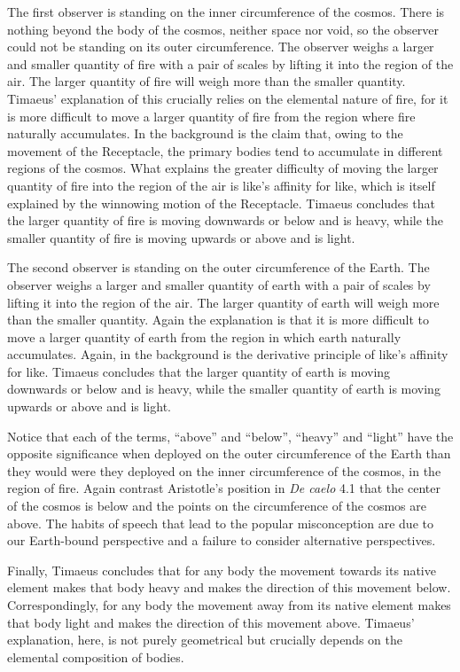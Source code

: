 The first observer is standing on the inner circumference of the cosmos. There is nothing beyond the body of the cosmos, neither space nor void, so the observer could not be standing on its outer circumference. The observer weighs a larger and smaller quantity of fire with a pair of scales by lifting it into the region of the air. The larger quantity of fire will weigh more than the smaller quantity. Timaeus' explanation of this crucially relies on the elemental nature of fire, for it is more difficult to move a larger quantity of fire from the region where fire naturally accumulates. In the background is the claim that, owing to the movement of the Receptacle, the primary bodies tend to accumulate in different regions of the cosmos. What explains the greater difficulty of moving the larger quantity of fire into the region of the air is like's affinity for like, which is itself explained by the winnowing motion of the Receptacle. Timaeus concludes that the larger quantity of fire is moving downwards or below and is heavy, while the smaller quantity of fire is moving upwards or above and is light.

The second observer is standing on the outer circumference of the Earth. The observer weighs a larger and smaller quantity of earth with a pair of scales by lifting it into the region of the air. The larger quantity of earth will weigh more than the smaller quantity. Again the explanation is that it is more difficult to move a larger quantity of earth from the region in which earth naturally accumulates. Again, in the background is the derivative principle of like's affinity for like. Timaeus concludes that the larger quantity of earth is moving downwards or below and is heavy, while the smaller quantity of earth is moving upwards or above and is light.

Notice that each of the terms, ``above'' and ``below'', ``heavy'' and ``light'' have the opposite significance when deployed on the outer circumference of the Earth than they would were they deployed on the inner circumference of the cosmos, in the region of fire. Again contrast Aristotle's position in \emph{De caelo} 4.1 that the center of the cosmos is below and the points on the circumference of the cosmos are above. The habits of speech that lead to the popular misconception are due to our Earth-bound perspective and a failure to consider alternative perspectives.

Finally, Timaeus concludes that for any body the movement towards its native element makes that body heavy and makes the direction of this movement below. Correspondingly, for any body the movement away from its native element makes that body light and makes the direction of this movement above. Timaeus' explanation, here, is not purely geometrical but crucially depends on the elemental composition of bodies.

